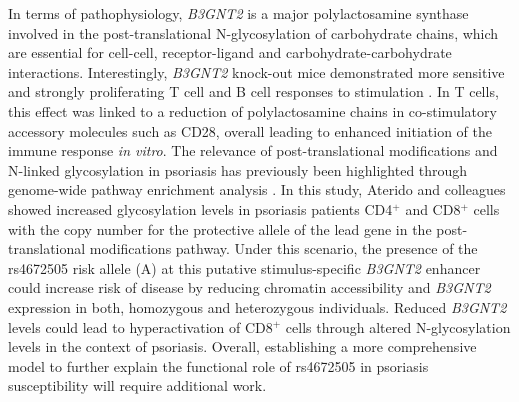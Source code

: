 In terms of pathophysiology, \textit{B3GNT2} is a major polylactosamine synthase involved in the post-translational N-glycosylation of carbohydrate chains, which are essential for cell-cell, receptor-ligand and carbohydrate-carbohydrate interactions. Interestingly, \textit{B3GNT2} knock-out mice demonstrated more sensitive  and strongly proliferating T cell and B cell responses to stimulation \parencite{Togayachi2010}. In T cells, this effect was linked to a reduction of polylactosamine chains in co-stimulatory accessory molecules such as CD28, overall leading to enhanced initiation of the immune response \textit{in vitro}. The relevance of post-translational modifications and N-linked glycosylation in psoriasis has previously been highlighted through genome-wide pathway enrichment analysis \parencite{Aterido2016}. In this study, Aterido and colleagues showed increased glycosylation levels in psoriasis patients CD4$^+$ and CD8$^+$ cells with the copy number for the protective allele of the lead gene in the post-translational modifications pathway. Under this scenario, the presence of the rs4672505 risk allele (A) at this putative stimulus-specific \textit{B3GNT2} enhancer could increase risk of disease by reducing chromatin accessibility and \textit{B3GNT2} expression in both, homozygous and heterozygous individuals. Reduced \textit{B3GNT2} levels could lead to hyperactivation of CD8$^+$ cells through altered N-glycosylation levels in the context of psoriasis.  %
Overall, establishing a more comprehensive model to further explain the functional role of rs4672505 in psoriasis susceptibility will require additional work.


